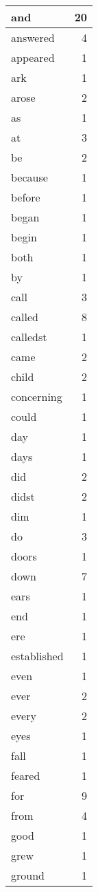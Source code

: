 \begin{center}
\begin{longtable}{l|r}
and & 20 \\ \hline
answered & 4 \\ \hline
appeared & 1 \\ \hline
ark & 1 \\ \hline
arose & 2 \\ \hline
as & 1 \\ \hline
at & 3 \\ \hline
be & 2 \\ \hline
because & 1 \\ \hline
before & 1 \\ \hline
began & 1 \\ \hline
begin & 1 \\ \hline
both & 1 \\ \hline
by & 1 \\ \hline
call & 3 \\ \hline
called & 8 \\ \hline
calledst & 1 \\ \hline
came & 2 \\ \hline
child & 2 \\ \hline
concerning & 1 \\ \hline
could & 1 \\ \hline
day & 1 \\ \hline
days & 1 \\ \hline
did & 2 \\ \hline
didst & 2 \\ \hline
dim & 1 \\ \hline
do & 3 \\ \hline
doors & 1 \\ \hline
down & 7 \\ \hline
ears & 1 \\ \hline
end & 1 \\ \hline
ere & 1 \\ \hline
established & 1 \\ \hline
even & 1 \\ \hline
ever & 2 \\ \hline
every & 2 \\ \hline
eyes & 1 \\ \hline
fall & 1 \\ \hline
feared & 1 \\ \hline
for & 9 \\ \hline
from & 4 \\ \hline
good & 1 \\ \hline
grew & 1 \\ \hline
ground & 1 \\ \hline

\end{longtable}
\end{center}
